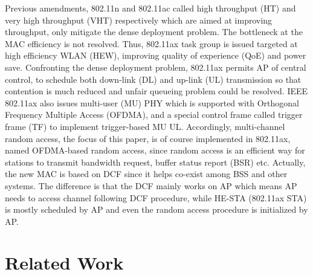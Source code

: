 Previous amendments, 802.11n and 802.11ac called high throughput (HT) and very high throughput (VHT) respectively which are aimed at improving throughput, only mitigate the dense deployment problem. 
The bottleneck at the MAC efficiency is not resolved.
Thus, 802.11ax task group is issued targeted at high efficiency WLAN (HEW), improving quality of experience (QoE) and power save.
Confronting the dense deployment problem, 802.11ax permits AP of central control, to schedule both down-link (DL) and up-link (UL) transmission so that contention is much reduced and unfair queueing problem could be resolved.
IEEE 802.11ax also issues multi-user (MU) PHY which is supported with Orthogonal Frequency Multiple Access (OFDMA), and a special control frame called trigger frame (TF) to implement trigger-based MU UL\cite{draft_ax}. %
Accordingly, multi-channel random access, the focus of this paper, is of course implemented in 802.11ax, named OFDMA-based random access, since random access is an efficient way for stations to transmit bandwidth request, buffer status report (BSR) etc. 
Actually, the new MAC is based on DCF since it helps co-exist among BSS and other systems. The difference is that the DCF mainly works on AP which means AP needs to access channel following DCF procedure, while HE-STA (802.11ax STA) is mostly scheduled by AP and even the random access procedure is initialized by AP. 


\section{Related Work}



